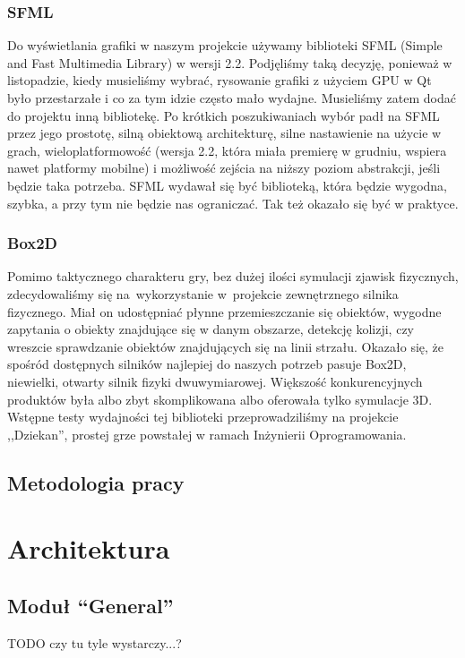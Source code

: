 \documentclass[licencjacka]{pracamgr}
\begin{document}
    \subsection{SFML}
    Do wyświetlania grafiki w naszym projekcie używamy biblioteki SFML (Simple and Fast Multimedia Library) w wersji
    2.2. Podjęliśmy taką decyzję, ponieważ w listopadzie, kiedy musieliśmy wybrać, rysowanie grafiki z użyciem GPU w Qt
    było przestarzałe i co za tym idzie często mało wydajne. Musieliśmy zatem dodać do projektu inną bibliotekę. Po
    krótkich poszukiwaniach wybór padł na SFML przez jego prostotę, silną obiektową architekturę, silne nastawienie na
    użycie w grach, wieloplatformowość (wersja 2.2, która miała premierę w grudniu, wspiera nawet platformy mobilne) i
    możliwość zejścia na niższy poziom abstrakcji, jeśli będzie taka potrzeba. SFML wydawał się być biblioteką, która
    będzie wygodna, szybka, a przy tym nie będzie nas ograniczać. Tak też okazało się być w praktyce.

    \subsection{Box2D}
    Pomimo taktycznego charakteru gry, bez dużej ilości symulacji zjawisk fizycznych, zdecydowaliśmy się na~wykorzystanie 
    w~projekcie zewnętrznego silnika fizycznego. Miał on udostępniać płynne przemieszczanie się obiektów, wygodne 
    zapytania o obiekty znajdujące się w danym obszarze, detekcję kolizji, czy wreszcie sprawdzanie obiektów
    znajdujących się na linii strzału. Okazało się, że spośród dostępnych silników najlepiej do naszych potrzeb pasuje 
    Box2D, niewielki, otwarty silnik fizyki dwuwymiarowej. Większość konkurencyjnych produktów była albo zbyt skomplikowana albo oferowała
    tylko symulacje 3D. Wstępne testy wydajności tej biblioteki przeprowadziliśmy na projekcie ,,Dziekan'', prostej grze 
    powstałej w ramach Inżynierii Oprogramowania.

  \section{Metodologia pracy}

\chapter{Architektura}
  \section{Moduł ``General''}
    TODO czy tu tyle wystarczy...?
\end{document}
